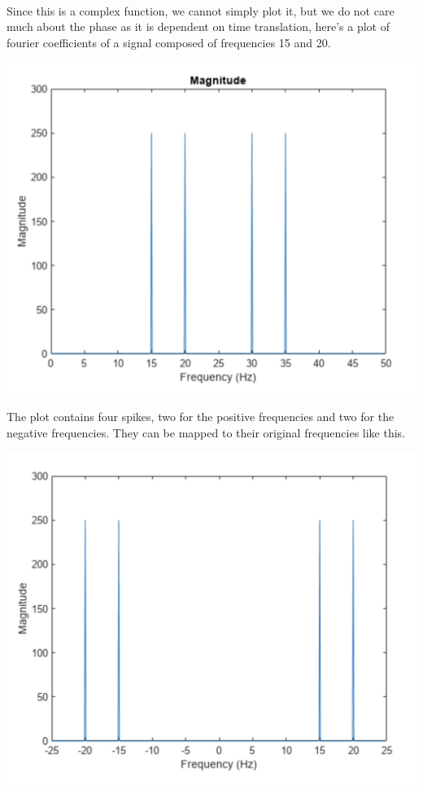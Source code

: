\documentclass{article}
\begin{document}
\paragraph{}

Since this is a complex function, we cannot simply plot it, but we do not care much about the phase as it is dependent on time translation, here's a plot of fourier coefficients of a signal composed of frequencies 15 and 20.

\begin{center}
	\includegraphics[scale=0.5]{raw.png}
\end{center}

The plot contains four spikes, two for the positive frequencies and two for the negative frequencies. They can be mapped to their original frequencies like this.

\begin{center}
	\includegraphics[scale=0.5]{shifted.png}
\end{center}
\end{document}
